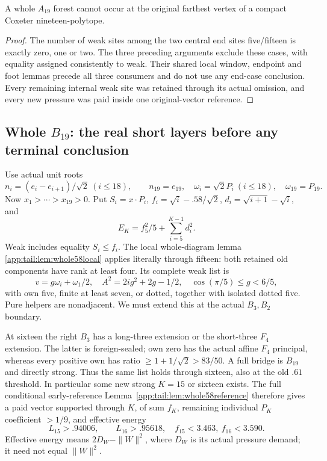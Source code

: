 \begin{proposition}\label{app:exact19:prop:wholeA19}
A whole \(A_{19}\) forest cannot occur
at the original farthest vertex of
a compact Coxeter nineteen-polytope.
\end{proposition}
\begin{proof}
The number of weak sites among the
two central end sites five/fifteen
is exactly zero, one or two.
The three preceding arguments
exclude these cases, with equality
assigned consistently to weak.
Their shared local window, endpoint
and foot lemmas precede all three
consumers and do not use any
end-case conclusion.
Every remaining internal weak
site was retained through its
actual omission, and every new
pressure was paid inside one
original-vector reference.
\end{proof}


\subsection{Whole \(B_{19}\): the real short layers before any terminal conclusion}
\label{app:exact19:Bwindow}

Use actual unit roots
\[
 n_i=(e_i-e_{i+1})/\sqrt2\ (i\le18),\qquad n_{19}=e_{19},
 \quad \omega_i=\sqrt2P_i\ (i\le18),\quad\omega_{19}=P_{19}.
\]
Now \(x_1>\cdots>x_{19}>0\).
Put \(S_i=x\cdot P_i\),
\(f_i=\sqrt i-.58/\sqrt2\),
\(d_i=\sqrt{i+1}-\sqrt i\), and
\[
                         E_K=f_5^2/5+\sum_{i=5}^{K-1}d_i^2 .
\]
Weak includes equality \(S_i\le f_i\).
The local whole-diagram lemma
\ref{app:tail:lem:whole58local} applies
literally through fifteen:
both retained old components have
rank at least four.
Its complete weak list is
\[
 v=g\omega_i+\omega_1/2,\quad
 A^2=2ig^2+2g-1/2,\quad
 \cos(\pi/5)\le g<6/5,
\tag{B19packet}\label{app:exact19:eq:Bpacket}
\]
with own five, finite at least seven,
or dotted, together with isolated
dotted five.
Pure helpers are nonadjacent.
We must extend this at the actual
\(B_3,B_2\) boundary.

At sixteen the right \(B_3\) has
a long-three extension or the
short-three \(F_4\) extension.
The latter is foreign-sealed;
own zero has the actual affine
\(F_4\) principal, whereas every
positive own has ratio
\(\ge1+1/\sqrt2>83/50\).
A full bridge is \(B_{19}\) and
directly strong.
Thus the same list holds through
sixteen, also at the old \(.61\)
threshold.
In particular some new strong
\(K=15\) or sixteen exists.
The full conditional early-reference
Lemma~\ref{app:tail:lem:whole58reference}
therefore gives a paid vector
supported through \(K\), of sum
\(f_K\), remaining individual
\(P_K\) coefficient \(>1/9\), and
effective energy
\[
               L_{15}>.94006,\qquad L_{16}>.95618,
               \quad f_{15}<3.463,\ f_{16}<3.590 .
\tag{B19early}\label{app:exact19:eq:Bearly}
\]
Effective energy means \(2D_W-\|W\|^2\),
where \(D_W\) is its actual pressure
demand; it need not equal \(\|W\|^2\).

